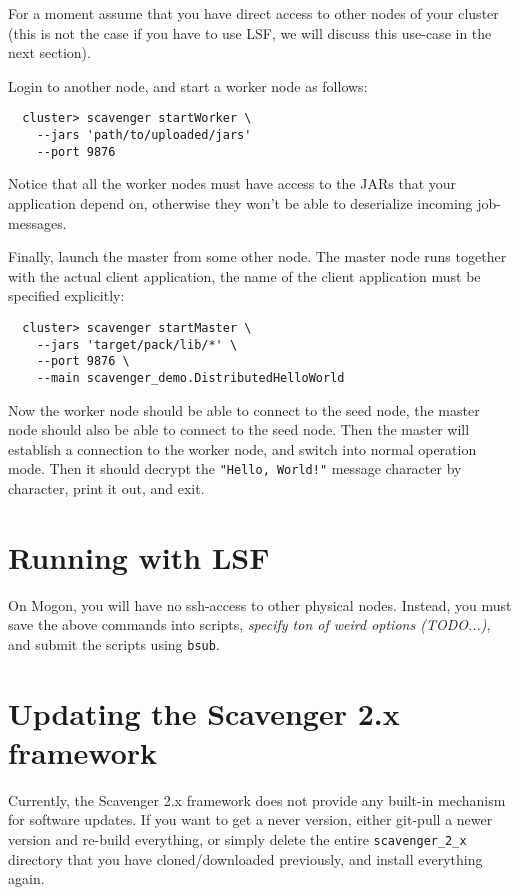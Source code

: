 \documentclass{scrbook}
\begin{document}
For a moment assume that you have direct access to other
nodes of your cluster (this is not the case if you have to
use LSF, we will discuss this use-case in the next section).

Login to another node, and start a worker node as follows:
\begin{lstlisting}
  cluster> scavenger startWorker \
    --jars 'path/to/uploaded/jars'
    --port 9876
\end{lstlisting}
Notice that all the worker nodes must have access to the
JARs that your application depend on, otherwise they won't
be able to deserialize incoming job-messages.

Finally, launch the master from some other node.
The master node runs together with the actual client
application, the name of the client application must 
be specified explicitly:
\begin{lstlisting}
  cluster> scavenger startMaster \
    --jars 'target/pack/lib/*' \
    --port 9876 \
    --main scavenger_demo.DistributedHelloWorld
\end{lstlisting}

Now the worker node should be able to connect to the
seed node, the master node should also be able to connect 
to the seed node. Then the master will establish a connection
to the worker node, and switch into normal operation mode.
Then it should decrypt the \lstinline{"Hello, World!"} message
character by character, print it out, and exit.

\section{Running with LSF}
On Mogon, you will have no ssh-access to other physical 
nodes. Instead, you must save the above commands into 
scripts, \emph{specify ton of weird options (TODO...)},
and submit the scripts using \lstinline{bsub}.

\section{Updating the Scavenger 2.x framework}
Currently, the Scavenger 2.x framework does not provide any built-in mechanism for
software updates. If you want to get a never version, either
git-pull a newer version and re-build everything, or simply
delete the entire \lstinline{scavenger_2_x} directory that you have cloned/downloaded previously, and install everything again.

\end{document}
